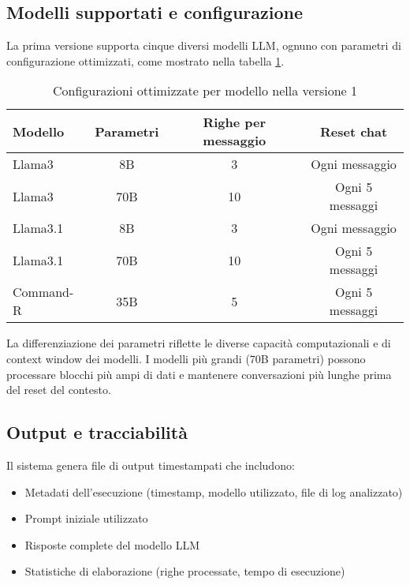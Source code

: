 \documentclass[12pt]{report}
\begin{document}
\subsection{Modelli supportati e configurazione}
\label{subsec:ver1_modelli_supportati}

La prima versione supporta cinque diversi modelli LLM, ognuno con parametri di configurazione ottimizzati, come mostrato nella tabella \ref{tab:modelli_llm_ver1}.

\begin{table}[h!]
    \centering
    \begin{tabular}{|l|c|c|c|}
        \hline
        \textbf{Modello} & \textbf{Parametri} & \textbf{Righe per messaggio} & \textbf{Reset chat} \\ \hline
        Llama3           & 8B                 & 3                            & Ogni messaggio      \\ \hline
        Llama3           & 70B                & 10                           & Ogni 5 messaggi     \\ \hline
        Llama3.1         & 8B                 & 3                            & Ogni messaggio      \\ \hline
        Llama3.1         & 70B                & 10                           & Ogni 5 messaggi     \\ \hline
        Command-R        & 35B                & 5                            & Ogni 5 messaggi     \\ \hline
    \end{tabular}
    \caption{Configurazioni ottimizzate per modello nella versione 1}
    \label{tab:modelli_llm_ver1}
\end{table}

La differenziazione dei parametri riflette le diverse capacità computazionali e di context window dei modelli. I modelli più grandi (70B parametri) possono processare blocchi più ampi di dati e mantenere conversazioni più lunghe prima del reset del contesto.

\subsection{Output e tracciabilità}
\label{subsec:ver1_output}

Il sistema genera file di output timestampati che includono:
\begin{itemize}
    \item Metadati dell'esecuzione (timestamp, modello utilizzato, file di log analizzato)
    \item Prompt iniziale utilizzato
    \item Risposte complete del modello LLM
    \item Statistiche di elaborazione (righe processate, tempo di esecuzione)
\end{itemize}
\end{document}
